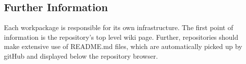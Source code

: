 \documentclass{template/openetcs_report}
\begin{document}
\subsection{Further Information}

Each workpackage is responsible for its own infrastructure. The first point of information is the repository's top level wiki page. Further, repositories should make extensive use of README.md files, which are automatically picked up by gitHub and displayed below the repository browser.




\renewcommand{\section}[2]{}
  
  

%  
%  

\end{document}

